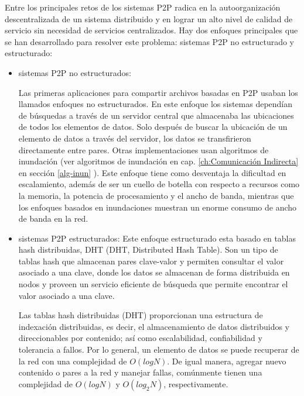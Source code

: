 Entre los principales retos \cite{Steinmetz2005} de los sistemas P2P radica en la autoorganización descentralizada de un sistema distribuido y en lograr un alto nivel de calidad de servicio sin necesidad de servicios centralizados. Hay dos enfoques principales que se han desarrollado para resolver este problema: sistemas P2P no estructurado y estructurado:

\begin{itemize}
	\item sistemas P2P no estructurados:
	
	Las primeras aplicaciones para compartir archivos basadas en P2P   usaban los llamados enfoques no estructurados. En este enfoque los  sistemas dependían de búsquedas a través de un servidor central que almacenaba las ubicaciones de todos los elementos de datos. Solo después de buscar la ubicación de un elemento de datos a través del servidor, los datos se transfirieron directamente entre pares. Otras implementaciones usan algoritmos de  inundación (ver algoritmos de  inundación en cap. \ref{ch:Comunicación Indirecta} en secci\'on \ref{alg-inun} ).
	Este enfoque tiene como desventaja la dificultad en escalamiento, además de ser un cuello de botella con respecto a recursos como la memoria, la potencia de procesamiento y el ancho de banda, mientras que los enfoques basados en inundaciones muestran un enorme consumo de ancho de banda en la red.  
	
	\item sistemas P2P estructurados: 
	Este enfoque estructurado esta basado en \gls{tablas hash distribuidas}, DHT (DHT, Distributed Hash Table).  Son un tipo de tablas hash que almacenan pares  clave-valor y permiten consultar el valor asociado a una clave, donde   los datos se almacenan de forma distribuida en   nodos  y proveen un servicio eficiente de búsqueda que permite encontrar el valor asociado a una clave.
	
    Las tablas hash distribuidas (DHT)  \cite{Wehrle2005a}  proporcionan una estructura de indexación distribuidas, es decir, el  almacenamiento de datos distribuidos y direccionables por contenido; así como    escalabilidad, confiabilidad y tolerancia a fallos. Por lo general, un elemento de datos se puede recuperar de la red con una complejidad de $O(logN)$. De igual manera,  agregar nuevo contenido o pares a la red  y manejar fallas, 	comúnmente tienen una complejidad de $O(logN)$ y $O(log_{2}N)$, respectivamente.
 
\end{itemize}

